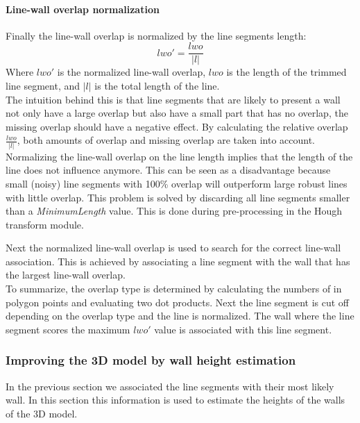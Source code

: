 	\paragraph{Line-wall overlap normalization}
	Finally the line-wall overlap is normalized by the line segments length:\\
	\begin{equation}
		lwo' =  \frac{lwo}{|l|}
	\end{equation}
	Where $lwo'$ is the normalized line-wall overlap, $lwo$ is the length of
	the trimmed line segment, and $|l|$ is the total length of the line.\\
	The intuition behind this is that line segments that are likely to
	present a wall not only have a large overlap but also have a small part
	that has no overlap, the missing overlap should have a negative effect. By
	calculating the relative overlap $\frac{lwo}{|l|}$, both amounts of overlap and missing
	overlap are taken into account.\\

	Normalizing the line-wall overlap on the line length implies that the length
	of the line does not influence anymore.  This can be seen as a
	disadvantage because small (noisy) line segments with 100\% overlap will
	outperform large robust lines with little overlap.  This problem is solved
	by discarding all line segments smaller than a \emph{MinimumLength} value.
	This is done during pre-processing in the Hough transform module. 

	Next the normalized line-wall overlap is used to search for the correct
	line-wall association. This is achieved by associating a line segment with
	the wall that has the largest line-wall overlap.\\

	To summarize, the overlap type is determined by calculating the numbers of in
	polygon points and evaluating two dot products. Next the line segment is cut off
	depending on the overlap type and the line is normalized. 
	The wall where the line segment scores the maximum $lwo'$ value is
	associated with this line segment.


\newpage
\subsubsection{Improving the 3D model by wall height estimation}
	In the previous section we associated the line segments with their most
	likely wall. In this section this information is used to estimate the
	heights of the walls of the 3D model. 

